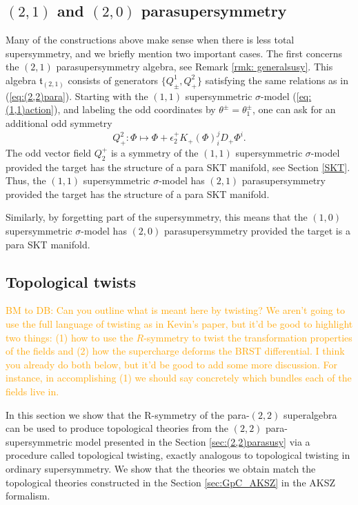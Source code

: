 \documentclass[letterpaper,12pt]{article}
\newcommand{\RR}{\mathbb{R}}
\theoremstyle{definition}
\theoremstyle{remark}
\theoremstyle{examples}
\def\brian{\textcolor{blue}{BM: }\textcolor{blue}}
\def\btd{\textcolor{orange}{BM to DB: }\textcolor{orange}}
\begin{document}
%

\subsection{$(2,1)$ and $(2,0)$ parasupersymmetry}
Many of the constructions above make sense when there is less total supersymmetry, and we briefly mention two important cases. The first concerns the $(2,1)$ parasupersymmetry algebra, see Remark \ref{rmk: generalsusy}. 
This algebra $\mathfrak{t}_{(2,1)}$ consists of generators $\{Q^1_\pm, Q^2_+\}$ satisfying the same relations as in (\ref{eq:(2,2)para}). 
Starting with the $(1,1)$ supersymmetric $\sigma$-model (\ref{eq:(1,1)action}), and labeling the odd coordinates by $\theta^\pm = \theta_1^\pm$, one can ask for an additional odd symmetry 
\[
Q^2_+ :  \Phi \mapsto \Phi + \epsilon_2^+ K_+(\Phi)^j_i D_+ \Phi^i .
\]
The odd vector field $Q_2^+$ is a symmetry of the $(1,1)$ supersymmetric $\sigma$-model provided the target has the structure of a para SKT manifold, see Section \ref{SKT}. 
Thus, the $(1,1)$ supersymmetric $\sigma$-model has $(2,1)$ parasupersymmetry provided the target has the structure of a para SKT manifold.

Similarly, by forgetting part of the supersymmetry, this means that the $(1,0)$ supersymmetric $\sigma$-model has $(2,0)$ parasupersymmetry provided the target is a para SKT manifold. 

\subsection{Topological twists}\label{sec:toptwist}

\btd{Can you outline what is meant here by twisting? We aren't going to use the full language of twisting as in Kevin's paper, but it'd be good to highlight two things: (1) how to use the $R$-symmetry to twist the transformation properties of the fields and (2) how the supercharge deforms the BRST differential.
I think you already do both below, but it'd be good to add some more discussion. 
For instance, in accomplishing (1) we should say concretely which bundles each of the fields live in.}

In this section we show that the R-symmetry of the para-$(2,2)$ superalgebra can be used to produce topological theories from the $(2,2)$ para-supersymmetric model presented in the Section \ref{sec:(2,2)parasusy} via a procedure called topological twisting, exactly analogous to topological twisting in ordinary supersymmetry. We show that the theories we obtain match the topological theories constructed in the Section \ref{sec:GpC_AKSZ} in the AKSZ formalism. 
\end{document}
